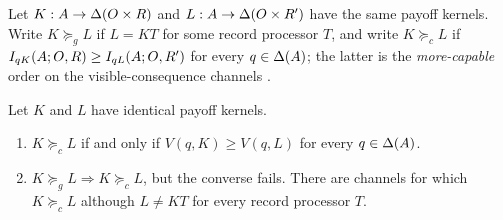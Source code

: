 \begin{definition}\label{def:channel-orders}
Let $K:A\to\Delta(O\times R)$ and $L:A\to\Delta(O\times R')$ have the same payoff kernels.  Write $K\succeq_gL$ if
$L=KT$ for some record processor $T$, and write $K\succeq_cL$ if
$I_{qK}(A;O,R)\ge I_{qL}(A;O,R')$ for every $q\in\Delta(A)$; the latter is the \emph{more-capable} order on the
visible-consequence channels \cite{KornerMarton1977}.
\end{definition}

\begin{proposition}\label{prop:blackwell}
Let $K$ and $L$ have identical payoff kernels.
\begin{enumerate}[label=\textup{(\roman*)},leftmargin=*]
\item $K\succeq_cL$ if and only if $V(q,K)\ge V(q,L)$ for every $q\in\Delta(A)$.
\item $K\succeq_gL\Rightarrow K\succeq_cL$, but the converse fails.  There are channels for which
$K\succeq_cL$ although $L\ne KT$ for every record processor $T$.
\end{enumerate}
\end{proposition}

